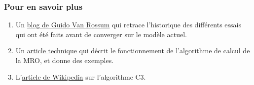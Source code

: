     \hypertarget{pour-en-savoir-plus}{%
\subsubsection{Pour en savoir plus}\label{pour-en-savoir-plus}}

    \begin{enumerate}
\def\labelenumi{\arabic{enumi}.}
\setcounter{enumi}{-1}
\tightlist
\item
  Un
  \href{http://python-history.blogspot.fr/2010/06/method-resolution-order.html}{blog
  de Guido Van Rossum} qui retrace l'historique des différents essais
  qui ont été faits avant de converger sur le modèle actuel.
\item
  Un \href{https://www.python.org/download/releases/2.3/mro/}{article
  technique} qui décrit le fonctionnement de l'algorithme de calcul de
  la MRO, et donne des exemples.
\item
  L'\href{http://en.wikipedia.org/wiki/C3_linearization}{article de
  Wikipedia} sur l'algorithme C3.
\end{enumerate}


    
    
    
